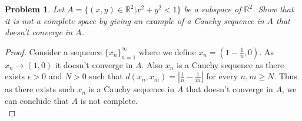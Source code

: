 \documentclass[paper=a4, fontsize=11pt]{scrartcl}
\newtheorem{problem}{Problem}
\begin{document}
\begin{problem}
	Let $A=\{ (x,y) \in \mathbb{R}^2 | x^2 + y^2 < 1 \}$ be a subspace of $\mathbb{R}^2$. Show that it is not a complete space by giving an example of a Cauchy sequence in $A$ that doesn't converge in $A$.\\
\end{problem}

\begin{proof}
	Consider a sequence $\{ x _n \}_{n=1}^\infty$ where we define $x_n = (1-\frac{1}{n},0)$. As $x_n \to (1,0)$ it doesn't converge in $A$. Also $x_n$ is a Cauchy sequence as there exists $\epsilon>0$ and $N>0$ such that $d(x_n,x_m)=\left| \frac{1}{n} - \frac{1}{m} \right|$ for every $n,m \geq N$. Thus as there exists such $x_n$ is a Cauchy sequence in $A$ that doesn't converge in $A$, we can conclude that $A$ is not complete.  \\
\end{proof}
\end{document}
